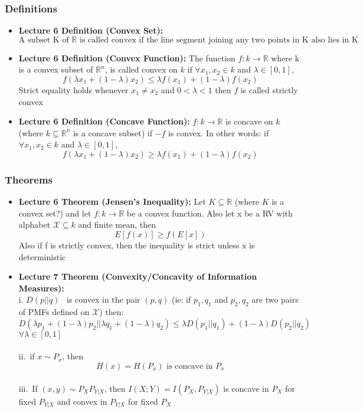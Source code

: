 \documentclass{article}
\begin{document}
\subsubsection{Definitions}
\begin{itemize}
    \item \textbf{Lecture 6 Definition (Convex Set):} \[\text{A subset K of } \mathbb{R} \text{ is called convex if the line segment joining any two points in K also lies in K}\]
    \item \textbf{Lecture 6 Definition (Convex Function):} The function \(f: k \to \mathbb{R}\) where k is a convex subset of \(\mathbb{R}^n\), is called convex on \(k\) if \(\forall x_1,x_2 \in k\) and \(\lambda \in [0,1]\),
    \[f(\lambda x_1 + (1-\lambda)x_2)\leq \lambda f(x_1) + (1-\lambda) f(x_2)\]
    Strict equality holds whenever \(x_1 \neq x_2\) and \(0< \lambda < 1\) then \(f\) is called strictly convex
    \item \textbf{Lecture 6 Definition (Concave Function):} \(f: k \to \mathbb{R}\) is concave on \(k\) (where \( k \subseteq \mathbb{R}^n\) is a concave subset) if \(-f\) is convex. In other words:
    if \(\forall x_1,x_2 \in k\) and \(\lambda \in [0,1]\),
    \[f(\lambda x_1 + (1-\lambda)x_2)\geq \lambda f(x_1) + (1-\lambda) f(x_2)\]

\end{itemize}
\subsubsection{Theorems}
\begin{itemize}
    \item \textbf{Lecture 6 Theorem (Jensen's Inequality):} Let \(K \subseteq \mathbb{R}\) (where \(K\) is a convex set?) and let \(f:k \to \mathbb{R}\) be a convex function. Also let  x be a RV with alphabet \(\mathcal{X} \subseteq k\) and finite mean, then
    \[E[f(x)] \geq f(E[x])\]
    Also if f is strictly convex, then the inequality is strict unless x is deterministic
    \item \textbf{Lecture 7 Theorem (Convexity/Concavity of Information Measures):}
       \\i. \(D(p||q)\) \ is convex in the pair \((p,q)\) (ie: if \(p_1,q_1\) and \(p_2,q_2\) are two pairs of PMFs defined on \(\mathcal{X}\)) then: \\
        \[D(\lambda p_1 + (1-\lambda)p_2 || \lambda q_1 + (1-\lambda) q_2) \leq \lambda D(p_1 || q_1) + (1- \lambda) D(p_2 || q_2)\]
        \(\forall \lambda \in [0,1]\)
        \\
        \\
        ii.\ if \(x \sim  P_x\), then
        \[H(x) = H(P_x) \text{ is concave in } P_x\]
        \\
        iii.\ If \((x,y) \sim P_X P_{Y|X}\), then \(I(X;Y) = I(P_X, P_{Y|X})\) is concave in \(P_X\) for fixed \(P_{Y|X}\) and convex in \(P_{Y|X}\) for fixed \(P_X\)

\end{itemize}
\end{document}

